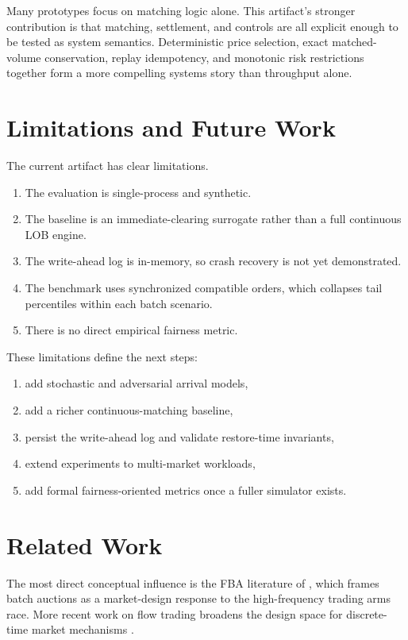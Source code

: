 \documentclass[11pt]{article}
\begin{document}
Many prototypes focus on matching logic alone. This artifact's stronger contribution is that matching, settlement, and controls are all explicit enough to be tested as system semantics. Deterministic price selection, exact matched-volume conservation, replay idempotency, and monotonic risk restrictions together form a more compelling systems story than throughput alone.

\section{Limitations and Future Work}

The current artifact has clear limitations.

\begin{enumerate}[leftmargin=1.5em]
  \item The evaluation is single-process and synthetic.
  \item The baseline is an immediate-clearing surrogate rather than a full continuous LOB engine.
  \item The write-ahead log is in-memory, so crash recovery is not yet demonstrated.
  \item The benchmark uses synchronized compatible orders, which collapses tail percentiles within each batch scenario.
  \item There is no direct empirical fairness metric.
\end{enumerate}

These limitations define the next steps:

\begin{enumerate}[leftmargin=1.5em]
  \item add stochastic and adversarial arrival models,
  \item add a richer continuous-matching baseline,
  \item persist the write-ahead log and validate restore-time invariants,
  \item extend experiments to multi-market workloads,
  \item add formal fairness-oriented metrics once a fuller simulator exists.
\end{enumerate}

\section{Related Work}

The most direct conceptual influence is the FBA literature of \citet{budish2015hft}, which frames batch auctions as a market-design response to the high-frequency trading arms race. More recent work on flow trading broadens the design space for discrete-time market mechanisms \citep{budish2023flow}.
\end{document}
